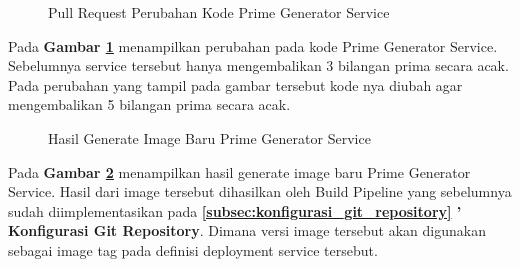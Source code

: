 \begin{figure}[H]
  \centering
  \caption{Pull Request Perubahan Kode Prime Generator Service}
  \label{fig:pull-request-code-changes-prime-service-5-return}
\end{figure}

Pada \textbf{Gambar \ref{fig:pull-request-code-changes-prime-service-5-return}}
menampilkan perubahan pada kode Prime Generator Service. Sebelumnya service
tersebut hanya mengembalikan 3 bilangan prima secara acak. Pada perubahan yang
tampil pada gambar tersebut kode nya diubah agar mengembalikan 5 bilangan prima
secara acak.

\begin{figure}[H]
  \centering
  \caption{Hasil Generate Image Baru Prime Generator Service}
  \label{fig:hasil-generate-image-baru-prime-service-5-return}
\end{figure}

Pada \textbf{Gambar \ref{fig:hasil-generate-image-baru-prime-service-5-return}}
menampilkan hasil generate image baru Prime Generator Service. Hasil dari image
tersebut dihasilkan oleh Build Pipeline yang sebelumnya sudah diimplementasikan
pada \textbf{\ref{subsec:konfigurasi_git_repository} ' Konfigurasi Git
  Repository}. Dimana versi image tersebut akan digunakan sebagai image tag pada
definisi deployment service tersebut.

